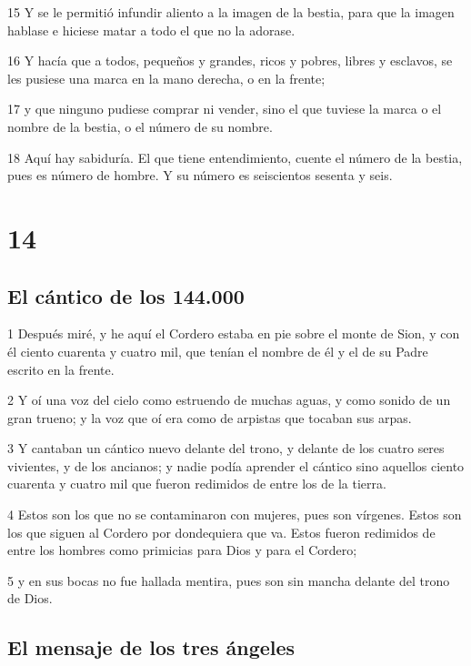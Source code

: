 \par 15 Y se le permitió infundir aliento a la imagen de la bestia, para que la imagen hablase e hiciese matar a todo el que no la adorase.
\par 16 Y hacía que a todos, pequeños y grandes, ricos y pobres, libres y esclavos, se les pusiese una marca en la mano derecha, o en la frente;
\par 17 y que ninguno pudiese comprar ni vender, sino el que tuviese la marca o el nombre de la bestia, o el número de su nombre.
\par 18 Aquí hay sabiduría. El que tiene entendimiento, cuente el número de la bestia, pues es número de hombre. Y su número es seiscientos sesenta y seis.

\chapter{14}

\section*{El cántico de los 144.000}

\par 1 Después miré, y he aquí el Cordero estaba en pie sobre el monte de Sion, y con él ciento cuarenta y cuatro mil, que tenían el nombre de él y el de su Padre escrito en la frente.
\par 2 Y oí una voz del cielo como estruendo de muchas aguas, y como sonido de un gran trueno; y la voz que oí era como de arpistas que tocaban sus arpas.
\par 3 Y cantaban un cántico nuevo delante del trono, y delante de los cuatro seres vivientes, y de los ancianos; y nadie podía aprender el cántico sino aquellos ciento cuarenta y cuatro mil que fueron redimidos de entre los de la tierra.
\par 4 Estos son los que no se contaminaron con mujeres, pues son vírgenes. Estos son los que siguen al Cordero por dondequiera que va. Estos fueron redimidos de entre los hombres como primicias para Dios y para el Cordero;
\par 5 y en sus bocas no fue hallada mentira, pues son sin mancha delante del trono de Dios.

\section*{El mensaje de los tres ángeles}

